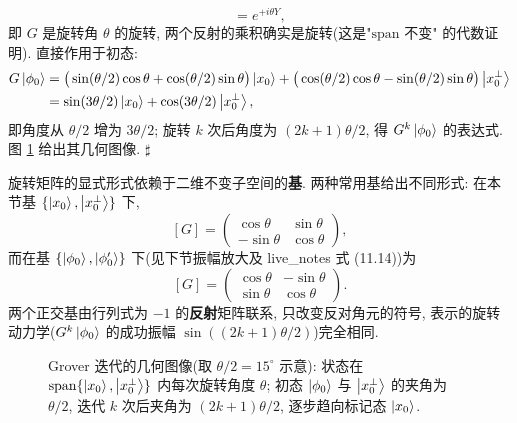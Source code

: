 \documentclass[utf8]{article} %
\numberwithin{equation}{section}   %
\newtheorem{Note}{\hskip 2em {\color{red} 注}}[subsection]
\newenvironment{Proof}[1][\relax]{{\noindent\it Proof\ifx\relax#1\relax\else\ (#1)\fi:}\quad}{\hfill $\sharp$\par}
\begin{document}
\begin{Proof}
\begin{equation}
        = e^{+i\theta Y},
    \end{equation}
    即 $G$ 是旋转角 $\theta$ 的旋转, 两个反射的乘积确实是旋转(这是"$\mathrm{span}$ 不变"
    的代数证明). 直接作用于初态:
    \begin{equation*}
    \begin{aligned}
        G\ket{\phi_0}
        &= \big(\sin(\theta/2)\cos\theta + \cos(\theta/2)\sin\theta\big)\ket{x_0}
        + \big(\cos(\theta/2)\cos\theta - \sin(\theta/2)\sin\theta\big)\ket{x_0^\perp} \\
        &= \sin(3\theta/2)\ket{x_0} + \cos(3\theta/2)\ket{x_0^\perp},
    \end{aligned}
    \end{equation*}
    即角度从 $\theta/2$ 增为 $3\theta/2$; 旋转 $k$ 次后角度为
    $(2k+1)\theta/2$, 得 $G^k\ket{\phi_0}$ 的表达式. 图 \ref{fig:grover} 给出其几何图像.
\end{Proof}

\begin{Note}[矩阵形式与基的选择]
    旋转矩阵的显式形式依赖于二维不变子空间的\textbf{基}. 两种常用基给出不同形式:
    在本节基 $\{\ket{x_0}, \ket{x_0^\perp}\}$ 下, 
    \[ [G] = \begin{pmatrix} \cos\theta & \sin\theta \\ -\sin\theta & \cos\theta \end{pmatrix}, \]
    而在基 $\{\ket{\phi_0}, \ket{\phi_0'}\}$ 下(见下节振幅放大及 live\_notes 式 (11.14))为
    \[ [G] = \begin{pmatrix} \cos\theta & -\sin\theta \\ \sin\theta & \cos\theta \end{pmatrix}. \]
    两个正交基由行列式为 $-1$ 的\textbf{反射}矩阵联系, 只改变反对角元的符号, 
    表示的旋转动力学($G^k\ket{\phi_0}$ 的成功振幅 $\sin((2k+1)\theta/2)$)完全相同.
\end{Note}

\begin{figure}[H]
\centering
{}
\caption{Grover 迭代的几何图像(取 $\theta/2 = 15^{\circ}$ 示意): 状态在
$\mathrm{span}\{\ket{x_0},\ket{x_0^\perp}\}$ 内每次旋转角度 $\theta$;
初态 $\ket{\phi_0}$ 与 $\ket{x_0^\perp}$ 的夹角为 $\theta/2$,
迭代 $k$ 次后夹角为 $(2k+1)\theta/2$, 逐步趋向标记态 $\ket{x_0}$.}
\label{fig:grover}
\end{figure}
\end{document}
